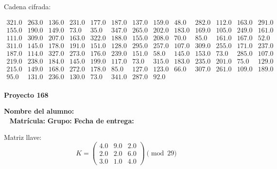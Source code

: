 \documentclass[12pt]{article}
\begin{document}
Cadena cifrada:
\begin{center}
$\begin{array}{lllllllllllll}
321.0 & 263.0 & 136.0 & 231.0 & 177.0 & 187.0 & 137.0 & 159.0 & 48.0 & 282.0 & 112.0 & 163.0 & 291.0\\
155.0 & 190.0 & 149.0 & 73.0 & 35.0 & 347.0 & 265.0 & 202.0 & 183.0 & 169.0 & 105.0 & 249.0 & 161.0\\
111.0 & 309.0 & 207.0 & 163.0 & 322.0 & 188.0 & 155.0 & 208.0 & 70.0 & 85.0 & 161.0 & 167.0 & 52.0\\
311.0 & 145.0 & 178.0 & 191.0 & 151.0 & 128.0 & 295.0 & 257.0 & 107.0 & 309.0 & 255.0 & 171.0 & 237.0\\
187.0 & 114.0 & 327.0 & 273.0 & 176.0 & 239.0 & 151.0 & 58.0 & 145.0 & 153.0 & 73.0 & 285.0 & 107.0\\
219.0 & 238.0 & 184.0 & 145.0 & 199.0 & 117.0 & 73.0 & 315.0 & 183.0 & 235.0 & 201.0 & 75.0 & 129.0\\
215.0 & 149.0 & 168.0 & 272.0 & 178.0 & 85.0 & 127.0 & 123.0 & 66.0 & 307.0 & 261.0 & 109.0 & 189.0\\
95.0 & 131.0 & 236.0 & 130.0 & 73.0 & 341.0 & 287.0 & 92.0\\
\end{array}$
\end{center}

\newpage


\textbf{Proyecto 168}

\textbf{Nombre del alumno:} \underline{\hspace{13cm}}\\\
\vspace{1cm}
\textbf{Matrícula:} \underline{\hspace{4cm}} \hspace{1cm}
\textbf{Grupo:} \underline{\hspace{2cm}}
\textbf{Fecha de entrega:} \underline{\hspace{2cm}}

\medskip

Matriz llave:
\[
K = \begin{pmatrix}
4.0 & 9.0 & 2.0\\
2.0 & 2.0 & 6.0\\
3.0 & 1.0 & 4.0
\end{pmatrix} \pmod{29}
\]
\end{document}
